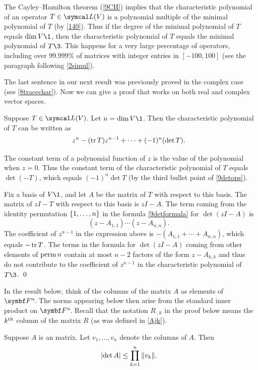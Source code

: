 The Cayley--Hamilton theorem (\ref{9CH}) implies that the characteristic polynomial of an operator $T \in \L(V)$ is a polynomial multiple of the minimal polynomial of $T$ (by \ref{140}). Thus if the degree of the minimal polynomial of $T$ equals $\dim V\1$, then the characteristic polynomial of $T$ equals the minimal polynomial of $T\3$. This happens for a very large percentage of operators, including over 99.999\% of  matrices with integer entries in $[-100, 100]$ (see the paragraph following \ref{2simul}).

The last sentence in our next result was previously proved in the complex case (see \ref{8tracechar}). Now we can give a proof that works on both real and complex vector spaces.

{Suppose $T \in \L(V)$. Let $n = \dim V\1$. Then the characteristic polynomial of $T$ can be written as
\[
z^n - (\operatorname{tr} T) z^{n-1} + \dots + (-1)^n (\det T).
\]}

\proof
The constant term of a polynomial function of $z$ is the value of the polynomial when $z = 0$. Thus the constant term of the characteristic polynomial of $T$ equals $\det(-T)$, which equals $(-1)^n \det T$ (by the third bullet point of \ref{9detops}).

Fix a basis of $V\1$, and let $A$ be the matrix of $T$ with respect to this basis. The matrix of $zI - T$ with respect to this basis is $zI - A$. The term coming from the identity permutation $\{1, \ldots, n\}$ in the formula \ref{9detformula} for $\det(zI - A)$ is
\[
(z - A_{1,1}) \cdots (z - A_{n,n}).
\]
The coefficient of $z^{n-1}$ in the expression above is $-(A_{1,1} + \cdots + A_{n,n})$,
 which equals $-\operatorname{tr} T$. The terms in the formula for $\det(zI - A)$ coming from other elements of $\operatorname{perm} n$ contain at most $n-2$ factors of the form $z - A_{k,k}$ and thus do not contribute to the coefficient of $z^{n-1}$ in the characteristic polynomial of $T\3$.
\qed

\pagebreak[3]


In the result below, think of the columns of the  matrix $A$ as elements of $\FF{n}$. The norms appearing below then arise from the standard inner product on $\FF{n}$. Recall that the notation $R_{\cdot, k}$ in the proof below means the $k^{\text{{th}}}$ column of the matrix $R$ (as was defined in \ref{Ajk}).

{Suppose $A$ is an  matrix. Let $v_1, \ldots, v_n$ denote the columns of $A$. Then
\vspace{-.04in} %
\[
\lvert \det A \rvert \le \prod_{k=1}^n \, \lVert v_k \rVert.
\]}

